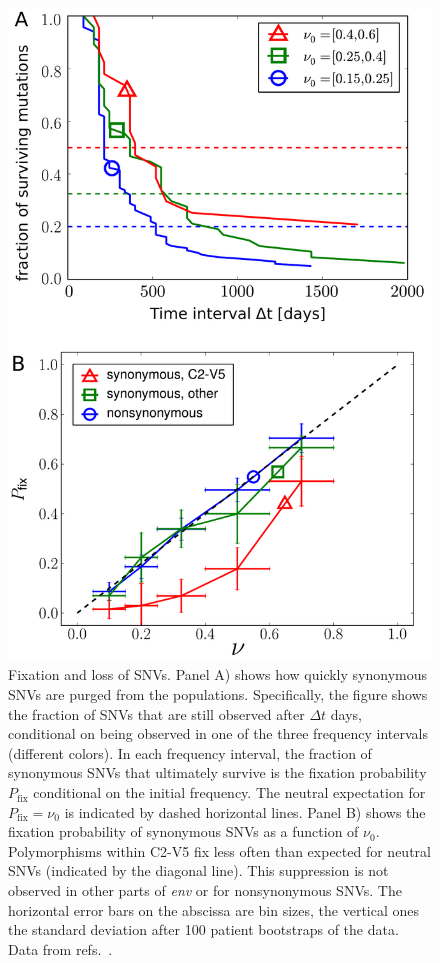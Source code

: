 \documentclass[11pt]{article}
\newcommand{\pfix}{P_{\mathrm{fix}}}
\newcommand{\env}{\textit{env}}
\newcommand{\shankaregion}{C2-V5}
\begin{document}
\begin{figure}
\begin{center}
\includegraphics[width=0.6\linewidth]{fig2}
\caption{Fixation and loss of SNVs.
Panel A) shows how quickly synonymous SNVs are purged from the populations. 
Specifically, the figure shows the fraction of SNVs that are still observed
after $\Delta t$ days, conditional on being observed in one of the three frequency 
intervals (different colors). 
In each frequency interval, the fraction of synonymous
SNVs that ultimately survive is the fixation probability $\pfix$ conditional on the
initial frequency. The neutral expectation for $\pfix=\nu_0$ is indicated by 
dashed horizontal lines.
Panel B) shows the fixation probability of synonymous SNVs as a function of $\nu_0$. Polymorphisms within \shankaregion{} fix less
often than expected for neutral SNVs (indicated by the diagonal line).
This suppression is not observed in other parts of \env{} or for nonsynonymous
SNVs.
The horizontal error bars on the abscissa are bin sizes, the vertical ones the
standard deviation after 100 patient bootstraps of the data. Data from
refs.~\cite{shankarappa_consistent_1999,liu_selection_2006, bunnik_autologous_2008}.}
\label{fig:fixp}
\end{center}
\end{figure}
\end{document}
